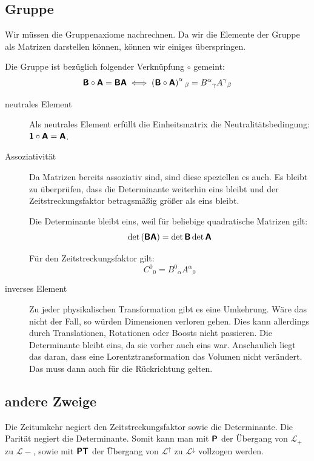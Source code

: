 \subsection{Gruppe}

Wir müssen die Gruppenaxiome nachrechnen. Da wir die Elemente der Gruppe als
Matrizen darstellen können, können wir einiges überspringen.

Die Gruppe ist bezüglich folgender Verknüpfung $\circ$ gemeint:
\[
	\tens B \circ \tens A = \tens B \tens A
	\iff
	\del{\tens B \circ \tens A}^\alpha{}_\beta = B^\alpha{}_\gamma A^\gamma{}_\beta
\]

\begin{description}
	\item[neutrales Element]
		Als neutrales Element erfüllt die Einheitsmatrix die
		Neutralitätsbedingung: $\boldsymbol{\mathsf{1}} \circ \boldsymbol{\mathsf{A}} = \boldsymbol{\mathsf{A}}$.

	\item[Assoziativität]
		Da Matrizen bereits assoziativ sind, sind diese speziellen es auch. Es
		bleibt zu überprüfen, dass die Determinante weiterhin eins bleibt und
		der Zeitstreckungsfaktor betragsmäßig größer als eins bleibt.

		Die Determinante bleibt eins, weil für beliebige quadratische Matrizen gilt:
		\[
			\det\del{\tens B \tens A} = \det \tens B \det \tens A
		\]

		Für den Zeitstreckungsfaktor gilt:
		\[
			C^0{}_0 = B^0{}_\alpha A^\alpha{}_0
		\]

		\fehlt

	\item[inverses Element]
		Zu jeder physikalischen Transformation gibt es eine Umkehrung. Wäre das
		nicht der Fall, so würden Dimensionen verloren gehen. Dies kann
		allerdings durch Translationen, Rotationen oder Boosts nicht passieren.
		Die Determinante bleibt eins, da sie vorher auch eins war. Anschaulich
		liegt das daran, dass eine Lorentztransformation das Volumen nicht
		verändert.  Das muss dann auch für die Rückrichtung gelten.
\end{description}

\subsection{andere Zweige}

Die Zeitumkehr negiert den Zeitstreckungsfaktor sowie die Determinante. Die
Parität negiert die Determinante. Somit kann man mit $\boldsymbol{\mathsf{P}}$ der Übergang von
$\mathcal L_+$ zu $\mathcal L-$, sowie mit $\boldsymbol{\mathsf{P}} \boldsymbol{\mathsf{T}}$ der Übergang von
$\mathcal L^\uparrow$ zu $\mathcal L^\downarrow$ vollzogen werden.


